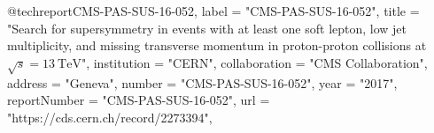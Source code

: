@techreport{CMS-PAS-SUS-16-052,
      label          = "CMS-PAS-SUS-16-052",
      title         = "{Search for supersymmetry in events with at least one soft
                       lepton, low jet multiplicity, and missing transverse
                       momentum in proton-proton collisions at
                       $\sqrt{s}=13~\mathrm{TeV}$}",
      institution   = "CERN",
      collaboration = "CMS Collaboration",
      address       = "Geneva",
      number        = "CMS-PAS-SUS-16-052",
      year          = "2017",
      reportNumber  = "CMS-PAS-SUS-16-052",
      url           = "https://cds.cern.ch/record/2273394",
}

